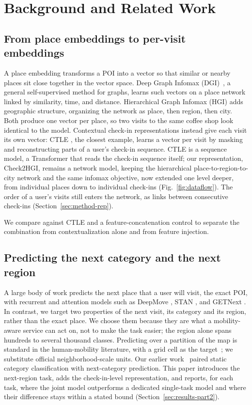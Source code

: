 \section{Background and Related Work}
\label{sec:related}

\subsection{From place embeddings to per-visit embeddings}
\label{sec:related-embeddings}
A place embedding transforms a POI into a vector so that similar or nearby
places sit close together in the vector space.
Deep Graph Infomax (DGI)~\cite{velickovic2019dgi}, a general self-supervised
method for graphs, learns such vectors on a place network linked by
similarity, time, and distance.
Hierarchical Graph Infomax (HGI) \cite{huang2023hgi} adds geographic structure,
organizing the network as place, then region, then city. Both produce one vector per place, so two visits to the same coffee shop look
identical to the model.
Contextual check-in representations instead give each visit its own vector: CTLE
\cite{lin2021ctle}, the closest example, learns a vector per visit by masking and
reconstructing parts of a user's check-in sequence. CTLE is a sequence model, a Transformer that reads the
check-in sequence itself; our representation, Check2HGI, remains a network model, keeping the
hierarchical place-to-region-to-city network and the same infomax objective,
now extended one level deeper, from individual places down to individual
check-ins (Fig.~\ref{fig:dataflow}). The order of a user's visits still enters
the network, as links between consecutive check-ins
(Section~\ref{sec:method-rep}).

We compare against CTLE and a feature-concatenation control to separate the
combination from contextualization alone and from feature injection.

\subsection{Predicting the next category and the next region}
\label{sec:related-tasks}
A large body of work predicts the next place that a user will visit, the exact POI,
with recurrent and attention models such as DeepMove \cite{feng2018deepmove}, STAN
\cite{luo2021stan}, and GETNext \cite{yang2022getnext}. In contrast, we target two properties of the next visit, its category and its
region, rather than the exact place. We choose them because they are
what a mobility-aware service can act on, not to make the task easier; the region
alone spans hundreds to several thousand classes. Predicting
over a partition of the map is standard in the human-mobility literature, with a grid cell as the
target~\cite{luca2021mobilitysurvey}; we substitute official neighborhood-scale units. Our earlier
work~\cite{silva2025mtlnet} paired static category classification with next-category prediction. This paper introduces the next-region task, adds the check-in-level
representation, and reports, for each task, where the joint model outperforms a dedicated single-task model
and where their difference stays within a stated bound (Section~\ref{sec:results-part2}).

